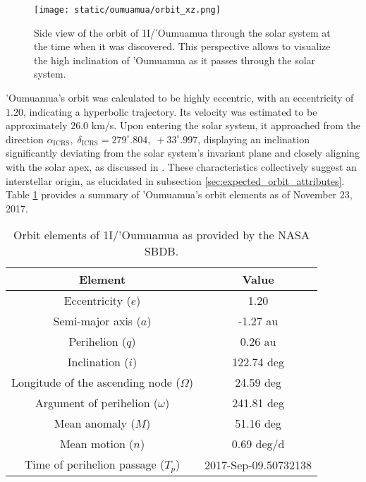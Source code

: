 \begin{figure}[H]
  \centering
  \texttt{[image: static/oumuamua/orbit\_xz.png]}
  \caption[Side view of the orbit of 1I/'Oumuamua through the solar system]{
    Side view of the orbit of 1I/'Oumuamua through the solar system at the time when it was
    discovered. This perspective allows to visualize the high inclination of
    'Oumuamua as it passes through the solar system.}
  \label{fig:oumuamua_orbit_xz}
\end{figure}

'Oumuamua's orbit was calculated to be highly eccentric, with an eccentricity of
$1.20$, indicating a hyperbolic trajectory. Its velocity was estimated to be
approximately $26.0$ km/s. Upon entering the solar system, it approached from
the direction $\alpha_{\text{ICRS}},\; \delta_{\text{ICRS}} = 279^\circ.804,\;
  +33^\circ.997$, displaying an inclination significantly deviating from the solar
system's invariant plane and closely aligning with the solar apex, as discussed
in \cite{mamajek2017}. These characteristics collectively suggest an
interstellar origin, as elucidated in subsection
\ref{sec:expected_orbit_attributes}. Table \ref{tab:oumuamua_elements} provides
a summary of 'Oumuamua's orbit elements as of November 23, 2017.

\begin{table}[H]
  \centering
  \begin{tabular}{|c|c|}
    \hline
    Element                                    & Value                \\
    \hline
    Eccentricity ($e$)                         & 1.20                 \\
    Semi-major axis ($a$)                      & -1.27 au             \\
    Perihelion ($q$)                           & 0.26 au              \\
    Inclination ($i$)                          & 122.74 deg           \\
    Longitude of the ascending node ($\Omega$) & 24.59 deg            \\
    Argument of perihelion ($\omega$)          & 241.81 deg           \\
    Mean anomaly ($M$)                         & 51.16 deg            \\
    Mean motion ($n$)                          & 0.69 deg/d           \\
    Time of perihelion passage ($T_p$)         & 2017-Sep-09.50732138 \\
    \hline
  \end{tabular}
  \caption{Orbit elements of 1I/'Oumuamua as provided by the NASA SBDB.}
  \label{tab:oumuamua_elements}
\end{table}


